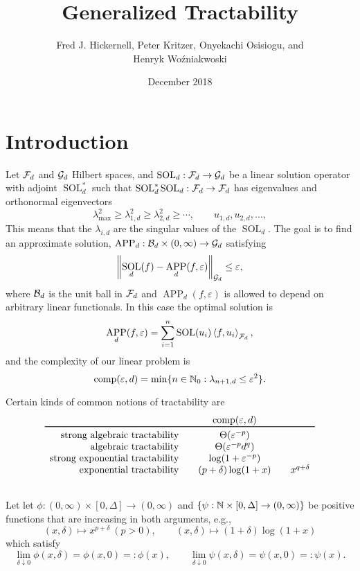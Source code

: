 \documentclass{article}
\title{Generalized Tractability}
\author{Fred J. Hickernell, Peter Kritzer, Onyekachi Osisiogu, and \\ Henryk Wo\'zniakwoski}
\date{December 2018}
\DeclareMathOperator{\SOL}{SOL}
\DeclareMathOperator{\APP}{APP}
\theoremstyle{definition}
\begin{document}
\maketitle

\section{Introduction}

Let $\mathcal{F}_d$ and $\mathcal{G}_d$ Hilbert spaces, and $\SOL_d : \cf_d \to \cg_d$ be a linear solution operator with adjoint $\SOL_d^*$ such that $\SOL_d^*\SOL_d : \cf_d \to \cf_d$ has eigenvalues and orthonormal eigenvectors  
\[
\lambda_{\max}^2 \ge \lambda_{1,d}^2 \ge \lambda_{2,d}^2 \ge \cdots, \qquad u_{1,d}, u_{2,d}, \ldots, 
\]
This means that the $\lambda_{i,d}$ are the singular values of the $\SOL_d$. The goal is to find an approximate solution, $\APP_d:\cb_d \times (0,\infty) \to \cg_d$ satisfying 
\[
\norm[\cg_d]{\SOL_d(f) - \APP_d(f,\varepsilon)} \le \varepsilon,
\]
where $\mathcal{B}_d$ is the unit ball in $\mathcal{F}_d$ and $\APP_d(f,\varepsilon)$ is allowed to depend on arbitrary linear functionals.  In this case the optimal solution is 
\[
\APP_d(f,\varepsilon) = \sum_{i=1}^n \SOL(u_i) \ip[\cf_d]{f}{u_i},
\]
and the complexity of our linear problem is
\[
\operatorname{comp}(\varepsilon, d) = \min \{n \in \mathbb{N}_{0} : \lambda_{n+1, d} \le \varepsilon^2\}.
\]

Certain kinds of common notions of tractability are 
\begin{equation*}
    \begin{array}{r@{\qquad}c@{\qquad}c}
    & \comp(\varepsilon, d)\\
    \toprule
    \text{strong algebraic tractability} & \Theta(\varepsilon^{-p})\\
    \text{ algebraic tractability} & \Theta(\varepsilon^{-p}d^{q})\\
    \text{strong exponential tractability} & \log(1 + \varepsilon^{-p})\\
    \text{ exponential tractability} &(p+\delta) \log(1 + x) &  x^{q+\delta} \\
    & 
    \end{array}
\end{equation*}

Let let $\phi : (0,\infty) \times [0,\Delta] \to (0,\infty)$ and $\{\psi : \mathbb{N}  \times [0,\Delta] \to (0,\infty)\}$ be positive functions that are increasing in both arguments, e.g., 
\[
(x,\delta) \mapsto x^{p + \delta} \ (p >0), \qquad (x,\delta) \mapsto (1 + \delta) \log(1+x)
\]
which satisfy
\begin{equation*}
    \lim_{\delta \downarrow 0} \phi(x,\delta) = \phi(x,0) =: \phi(x), \qquad 
    \lim_{\delta \downarrow 0} \psi(x,\delta) = \psi(x,0) =: \psi(x).
\end{equation*}
\end{document}

